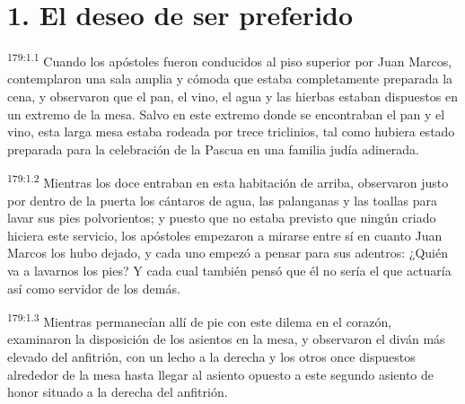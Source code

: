 \section*{1. El deseo de ser preferido}
\par
\textsuperscript{179:1.1} Cuando los apóstoles fueron conducidos al piso superior por Juan Marcos, contemplaron una sala amplia y cómoda que estaba completamente preparada la cena, y observaron que el pan, el vino, el agua y las hierbas estaban dispuestos en un extremo de la mesa. Salvo en este extremo donde se encontraban el pan y el vino, esta larga mesa estaba rodeada por trece triclinios, tal como hubiera estado preparada para la celebración de la Pascua en una familia judía adinerada.

\par
\textsuperscript{179:1.2} Mientras los doce entraban en esta habitación de arriba, observaron justo por dentro de la puerta los cántaros de agua, las palanganas y las toallas para lavar sus pies polvorientos; y puesto que no estaba previsto que ningún criado hiciera este servicio, los apóstoles empezaron a mirarse entre sí en cuanto Juan Marcos los hubo dejado, y cada uno empezó a pensar para sus adentros: ¿Quién va a lavarnos los pies? Y cada cual también pensó que él no sería el que actuaría así como servidor de los demás.

\par
\textsuperscript{179:1.3} Mientras permanecían allí de pie con este dilema en el corazón, examinaron la disposición de los asientos en la mesa, y observaron el diván más elevado del anfitrión, con un lecho a la derecha y los otros once dispuestos alrededor de la mesa hasta llegar al asiento opuesto a este segundo asiento de honor situado a la derecha del anfitrión.


